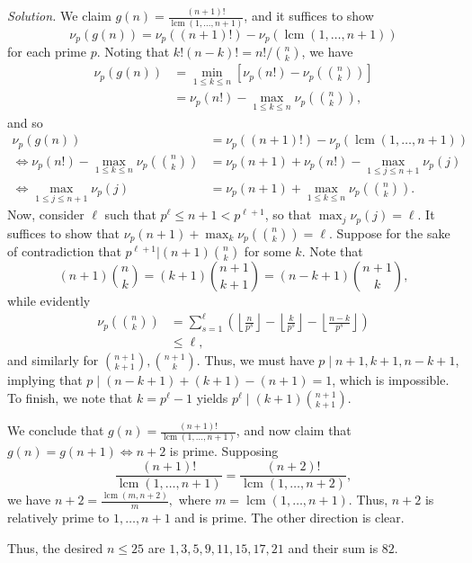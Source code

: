 \documentclass[10pt]{article}
\newcommand{\lcm}{\operatorname{lcm}}
\newcommand{\solution}
{
\vspace{5pt}
\noindent\textit{Solution.}\qquad
}
\begin{document}
\begin{enumerate}
	\solution We claim $g(n) = \frac{(n+1)!}{\lcm(1, \ldots, n+1)}$, and it suffices to show 
	\[
		\nu_p(g(n)) = \nu_p((n+1)!) - \nu_p(\lcm(1, \ldots, n+1))
	\]
	for each prime $p$. Noting that $k!(n-k)! = n!/\binom{n}{k}$, we have
	\begin{align*}
		\nu_p(g(n)) &= \min_{1 \leq k \leq n} \left[\nu_p(n!) - \nu_p\left(\binom{n}{k}\right)\right]\\
		&= \nu_p(n!) - \max_{1 \leq k \leq n} \nu_p\left(\binom{n}{k}\right),
	\end{align*}
	and so 
	\begin{align*}
		\nu_p(g(n)) &= \nu_p((n+1)!) - \nu_p(\lcm(1, \ldots, n+1))\\
		\Leftrightarrow \nu_p(n!) - \max_{1 \leq k \leq n} \nu_p\left(\binom{n}{k}\right) &= \nu_p(n+1) + \nu_p(n!) - \max_{1 \leq j \leq n+1} \nu_p(j)\\
		\Leftrightarrow \max_{1 \leq j \leq n+1} \nu_p(j) &= \nu_p(n+1) + \max_{1 \leq k \leq n} \nu_p\left(\binom{n}{k}\right).
	\end{align*}
	Now, consider $\ell$ such that $p^{\ell} \leq n+1 < p^{\ell+1}$, so that $\max_{j} \nu_p(j) = \ell$. It suffices to show that $\nu_p(n+1) + \max_{k} \nu_p(\binom{n}{k}) = \ell$. Suppose for the sake of contradiction that $p^{\ell+1} | (n+1)\binom{n}{k}$ for some $k$. Note that 
	\[
		(n+1)\binom{n}{k} = (k+1) \binom{n+1}{k+1} = (n-k+1)\binom{n+1}{k},
	\]
	while evidently 
	\begin{align*}
		\nu_p\left(\binom{n}{k}\right) &= \sum_{s = 1}^{\ell} \left( \left\lfloor \frac{n}{p^{s}} \right\rfloor- \left\lfloor \frac{k}{p^{s}} \right\rfloor - \left\lfloor \frac{n-k}{p^{s}} \right\rfloor  \right)\\
		&\leq \ell,
	\end{align*}
	and similarly for $\binom{n+1}{k+1}, \binom{n+1}{k}$. Thus, we must have $p \mid n+1, k+1, n-k+1$, implying that $p \mid (n-k+1) + (k+1) - (n+1) = 1$, which is impossible. To finish, we note that $k = p^{\ell} - 1$ yields $p^{\ell} \mid (k+1) \binom{n+1}{k+1}$.

	\par We conclude that $g(n) = \frac{(n+1)!}{\lcm(1, \ldots, n+1)}$, and now claim that $g(n) = g(n+1) \Leftrightarrow n+2$ is prime. Supposing 
	\[
		\frac{(n+1)!}{\lcm(1, \ldots, n+1)} = \frac{(n+2)!}{\lcm(1, \ldots, n+2)},
	\]
	we have $n+2 = \frac{\lcm(m, n+2)}{m},$ where $m = \lcm(1, \ldots, n+1)$. Thus, $n+2$ is relatively prime to $1, \ldots, n+1$ and is prime. The other direction is clear.

	\par Thus, the desired $n \leq 25$ are $1, 3, 5, 9, 11, 15, 17, 21$ and their sum is $\boxed{82}$.

\end{enumerate}
\end{document}
